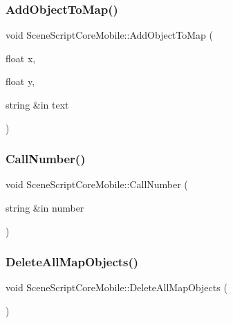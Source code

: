 \hypertarget{class_scene_script_core_mobile_a4976087580c2e72e5301a3f6530b7aee}{}\label{class_scene_script_core_mobile_a4976087580c2e72e5301a3f6530b7aee} 
\subsubsection{\texorpdfstring{Add\+Object\+To\+Map()}{AddObjectToMap()}}
{\footnotesize\ttfamily void Scene\+Script\+Core\+Mobile\+::\+Add\+Object\+To\+Map (\begin{DoxyParamCaption}\item[{float}]{x,  }\item[{float}]{y,  }\item[{string \&in}]{text }\end{DoxyParamCaption})}

\hypertarget{class_scene_script_core_mobile_ae32e99bac06ecfb842cecf9bac3e0b22}{}\label{class_scene_script_core_mobile_ae32e99bac06ecfb842cecf9bac3e0b22} 
\subsubsection{\texorpdfstring{Call\+Number()}{CallNumber()}}
{\footnotesize\ttfamily void Scene\+Script\+Core\+Mobile\+::\+Call\+Number (\begin{DoxyParamCaption}\item[{string \&in}]{number }\end{DoxyParamCaption})}

\hypertarget{class_scene_script_core_mobile_a851aa58f214a966bb04abdbb1187e52e}{}\label{class_scene_script_core_mobile_a851aa58f214a966bb04abdbb1187e52e} 
\subsubsection{\texorpdfstring{Delete\+All\+Map\+Objects()}{DeleteAllMapObjects()}}
{\footnotesize\ttfamily void Scene\+Script\+Core\+Mobile\+::\+Delete\+All\+Map\+Objects (\begin{DoxyParamCaption}{ }\end{DoxyParamCaption})}

